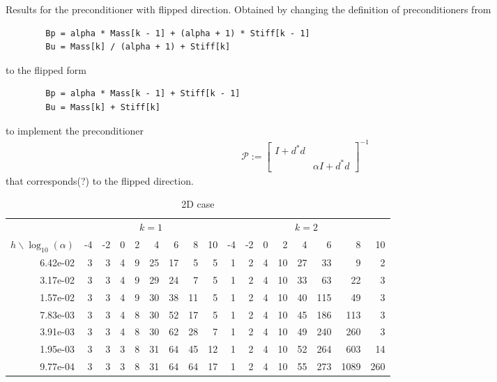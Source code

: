 \documentclass{amsart}
\begin{document}
	
	Results for the preconditioner with flipped direction.
	Obtained by changing the definition of preconditioners from
	\begin{verbatim}
		Bp = alpha * Mass[k - 1] + (alpha + 1) * Stiff[k - 1]
		Bu = Mass[k] / (alpha + 1) + Stiff[k]
	\end{verbatim}
	
	to the flipped form
	
	\begin{verbatim}
		Bp = alpha * Mass[k - 1] + Stiff[k - 1]
		Bu = Mass[k] + Stiff[k]
	\end{verbatim}
	
	to implement the preconditioner
	\begin{align}\label{eq: preconditioner}
		\mathcal{P} := \begin{bmatrix}
			I + d^* d & \\
			& \alpha I +  d^* d
		\end{bmatrix}^{-1}
	\end{align}
	that corresponds(?) to the flipped direction.
	
	\begin{table}[h]
		\caption{2D case}	
		\begin{tabular}{r|rrrrrrrr|rrrrrrrr}
			\hline
			& \multicolumn{8}{|c}{$k = 1$} & \multicolumn{8}{|c}{$k = 2$}\\
			$h \backslash \log_{10}(\alpha)$ & -4 & -2 & 0 & 2 & 4 & 6 & 8 & 10 & -4 & -2 & 0 & 2 & 4 & 6 & 8 & 10 \\
			\hline
			6.42e-02 & 3 & 3 & 4 & 9 & 25 & 17 & 5 & 5 & 1 & 2 & 4 & 10 & 27 & 33 & 9 & 2 \\
			3.17e-02 & 3 & 3 & 4 & 9 & 29 & 24 & 7 & 5 & 1 & 2 & 4 & 10 & 33 & 63 & 22 & 3 \\
			1.57e-02 & 3 & 3 & 4 & 9 & 30 & 38 & 11 & 5 & 1 & 2 & 4 & 10 & 40 & 115 & 49 & 3 \\
			7.83e-03 & 3 & 3 & 4 & 8 & 30 & 52 & 17 & 5 & 1 & 2 & 4 & 10 & 45 & 186 & 113 & 3 \\
			3.91e-03 & 3 & 3 & 4 & 8 & 30 & 62 & 28 & 7 & 1 & 2 & 4 & 10 & 49 & 240 & 260 & 3 \\
			1.95e-03 & 3 & 3 & 3 & 8 & 31 & 64 & 45 & 12 & 1 & 2 & 4 & 10 & 52 & 264 & 603 & 14 \\
			9.77e-04 & 3 & 3 & 3 & 8 & 31 & 64 & 64 & 17 & 1 & 2 & 4 & 10 & 55 & 273 & 1089 & 260 
		\end{tabular}
	\end{table}
	
\end{document}
